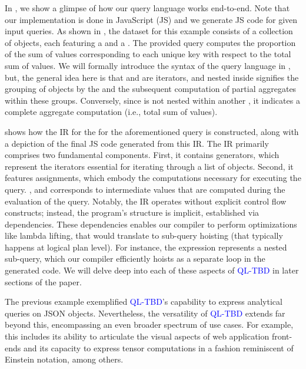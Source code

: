 \documentclass[runningheads]{llncs}
\newcommand{\lang}{\textcolor{blue}{QL-TBD}}
\begin{document}
In , we show a glimpse of how our query language works end-to-end.
Note that our implementation is done in JavaScript (JS) and we generate JS code for given input queries.
As shown in , the dataset for this example consists of a collection
of objects, each featuring a  and a .
The provided query computes the proportion of the sum of values corresponding to
each unique key with respect to the total sum of values.
We will formally introduce the syntax of the query language in ,
but, the general idea here is that \inline{*} and  are iterators, and 
 nested inside  signifies the grouping of objects by the
 and the subsequent computation of partial aggregates within these groups.
Conversely, since  is not nested within another , it indicates
a complete aggregate computation (i.e., total sum of values).

 shows how the IR for the  for the aforementioned query is
constructed, along with a depiction of the final JS code generated from this IR.
The IR primarily comprises two fundamental components.
First, it contains generators, which represent the iterators essential for iterating
through a list of objects.
Second, it features assignments, which embody the computations necessary for executing
the query.
,  and  corresponds to intermediate values
that are computed during the evaluation of the query.
Notably, the IR operates without explicit control flow constructs; instead, the
program's structure is implicit, established via dependencies.
These dependencies enables our compiler to perform optimizations like lambda lifting,
that would translate to sub-query hoisting (that typically happens at logical plan level).
For instance, the expression  represents a nested sub-query,
which our compiler efficiently hoists as a separate loop in the generated code.
We will delve deep into each of these aspects of \lang{} in later sections of the paper.

The previous example exemplified \lang{}'s capability to express analytical queries on JSON
objects.
Nevertheless, the versatility of \lang{} extends far beyond this, encompassing an even broader
spectrum of use cases. 
For example, this includes its ability to articulate the visual aspects of web application
front-ends and its capacity to express tensor computations in a fashion reminiscent of
Einstein notation, among others.
\end{document}
